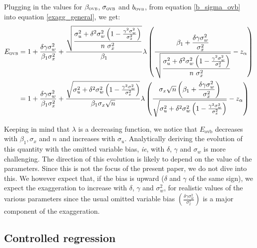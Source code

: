 \documentclass[a4paper, 11pt]{report}
\begin{document}
				Plugging in the values for $\beta_{\textsc{ovb}}$, $\sigma_{\textsc{ovb}}$ and $b_{\textsc{ovb}}$, from equation \ref{b_sigma_ovb} into equation \ref{exagg_general}, we get:
			~
			\begin{align*}
				E_{\textsc{ovb}} 
				   & = 1 + 
				\dfrac{\delta \gamma \sigma_{w}^{2}}{\beta_{1}\sigma_{x}^{2}} +
				 \dfrac{\sqrt{\dfrac{ \sigma_{u}^{2} +  \delta^{2} \sigma_{w}^{2} \left(1 - \frac{\gamma^{2}\sigma_{w}^{2}}{\sigma_{x}^{2}} \right)}{n \ \sigma_{x}^{2}}}}{\beta_{1}}
				 \lambda \left( \dfrac{\beta_{1} + \dfrac{\delta \gamma \sigma_{w}^{2}}{\sigma_{x}^{2}} }{\sqrt{\dfrac{ \sigma_{u}^{2} +  \delta^{2} \sigma_{w}^{2} \left(1 - \frac{\gamma^{2}\sigma_{w}^{2}}{\sigma_{x}^{2}} \right)}{n \ \sigma_{x}^{2}}}} - z_{\alpha} \right)\\
				 & = 1 + 
				\dfrac{\delta \gamma \sigma_{w}^{2}}{\beta_{1}\sigma_{x}^{2}} +
				 \dfrac{\sqrt{ \sigma_{u}^{2} +  \delta^{2} \sigma_{w}^{2} \left(1 - \frac{\gamma^{2}\sigma_{w}^{2}}{\sigma_{x}^{2}} \right)}}{\beta_{1} \sigma_{x} \sqrt{n}}
				 \lambda \left( \dfrac{ \sigma_{x}\sqrt{n} \left( \beta_{1} + \dfrac{\delta \gamma \sigma_{w}^{2}}{\sigma_{x}^{2}} \right)  }{\sqrt{\sigma_{u}^{2} +  \delta^{2} \sigma_{w}^{2} \left(1 - \frac{\gamma^{2}\sigma_{w}^{2}}{\sigma_{x}^{2}} \right)}} - z_{\alpha} \right)
			\end{align*}
			
				Keeping in mind that $\lambda$ is a decreasing function, we notice that $E_\text{ovb}$ decreases with $\beta_{1}, \sigma_{x}$ and $n$ and increases with $\sigma_{u}$. Analytically deriving the evolution of this quantity with the omitted variable bias, \textit{ie}, with $\delta$, $\gamma$ and $\sigma_{w}$ is more challenging. The direction of this evolution is likely to depend on the value of the parameters. Since this is not the focus of the present paper, we do not dive into this. We however expect that, if the bias is upward ($\delta$ and $\gamma$ of the same sign), we expect the exaggeration to increase with $\delta$, $\gamma$ and $\sigma_{w}^{2}$, for realistic values of the various parameters since the usual omitted variable bias $\left( \frac{\delta \gamma \sigma_{w}^{2}}{\sigma_{x}^{2}} \right)$ is a major component of the exaggeration. 

				
				
				\subsection{Controlled regression}\label{formal_proof_ctrl}
		
\end{document}
